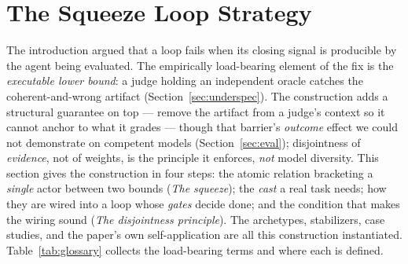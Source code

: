 \documentclass[11pt]{article}
\begin{document}
\section{The Squeeze Loop Strategy}
\label{sec:strategy}

The introduction argued that a loop fails when its closing signal is producible by the agent
being evaluated. The empirically load-bearing element of the fix is the \emph{executable lower bound}:
a judge holding an independent oracle catches the coherent-and-wrong artifact
(Section~\ref{sec:underspec}). The construction adds a structural guarantee on top --- remove the
artifact from a judge's context so it cannot anchor to what it grades --- though that barrier's
\emph{outcome} effect we could not demonstrate on competent models (Section~\ref{sec:eval}); disjointness
of \emph{evidence}, not of weights, is the principle it enforces, \emph{not} model diversity. This
section gives the
construction in four steps: the atomic relation bracketing a \emph{single} actor between two
bounds (\emph{The squeeze}); the \emph{cast} a real task needs; how they are wired into a loop
whose \emph{gates} decide done; and the condition that makes the wiring sound
(\emph{The disjointness principle}). The archetypes, stabilizers, case studies, and the paper's
own self-application are all this construction instantiated. Table~\ref{tab:glossary} collects
the load-bearing terms and where each is defined.
\end{document}
